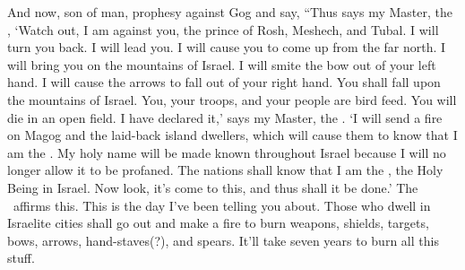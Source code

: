 
\begin{inparaenum}
   And now, son of man,%
  prophesy against Gog and say, ``Thus says my Master, the \lord, `Watch out,  I am against you,%
  the prince of Rosh, Meshech, and Tubal.%
   I will turn you back.%
  I will lead you. I will cause you to come up  from the far north. I will bring you on the mountains of Israel.%
   I will smite the bow out of your left hand.%
  I will cause the arrows to fall out of your right hand.%
   You shall fall upon the mountains of Israel. You, your troops, and your people are bird feed.%
   You will die in an open field. I have declared it,' says my Master, the \lord.%
   `I will send a fire on Magog and the laid-back island dwellers, which  will cause them to know that I am the \lord.%
   My holy name will be made known throughout Israel because I will no longer allow it to be profaned. The nations shall know that I am the \lord, the Holy Being in Israel.%
   Now look, it's come to this, and thus shall it be done.' The \lord\ affirms this. This is the day I've been telling you about.%
   Those who dwell in Israelite cities shall go out and make a fire to burn weapons, shields, targets, bows, arrows, hand-staves(?), and spears. It'll take seven years to burn all this stuff.%
\end{inparaenum}
